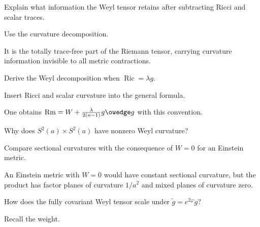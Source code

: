 \begin{exercise}[Decomposition]\label{exr:vii28-ped-06}
Explain what information the Weyl tensor retains after subtracting Ricci and scalar traces.
\end{exercise}

\begin{hint}
Use the curvature decomposition.
\end{hint}

\begin{solution}
It is the totally trace-free part of the Riemann tensor, carrying curvature information invisible to all metric contractions.
\end{solution}

\begin{exercise}\label{exr:vii28-ped-07}
Derive the Weyl decomposition when \(\operatorname{Ric}=\lambda g\).
\end{exercise}

\begin{hint}
Insert Ricci and scalar curvature into the general formula.
\end{hint}

\begin{solution}
One obtains \(\operatorname{Rm}=W+\frac{\lambda}{2(n-1)}g\owedge g\) with this convention.
\end{solution}

\begin{exercise}\label{exr:vii28-ped-08}
Why does \(S^2(a)\times S^2(a)\) have nonzero Weyl curvature?
\end{exercise}

\begin{hint}
Compare sectional curvatures with the consequence of \(W=0\) for an Einstein metric.
\end{hint}

\begin{solution}
An Einstein metric with \(W=0\) would have constant sectional curvature, but the product has factor planes of curvature \(1/a^2\) and mixed planes of curvature zero.
\end{solution}

\begin{exercise}\label{exr:vii28-ped-09}
How does the fully covariant Weyl tensor scale under \(\widetilde g=e^{2\varphi}g\)?
\end{exercise}

\begin{hint}
Recall the weight.
\end{hint}

